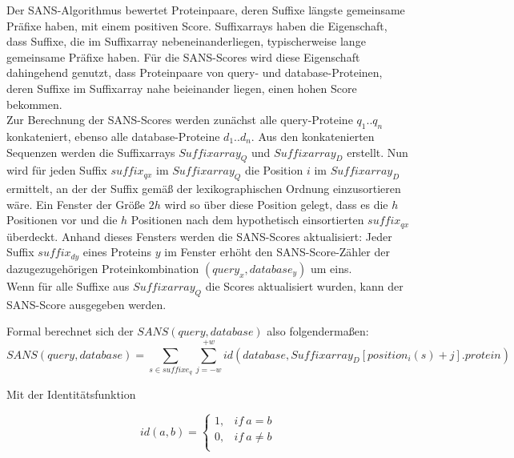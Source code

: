 \documentclass{article}
\begin{document}
Der SANS-Algorithmus bewertet Proteinpaare, deren Suffixe längste gemeinsame Präfixe haben, mit einem positiven Score. Suffixarrays haben die Eigenschaft, dass Suffixe, die im Suffixarray nebeneinanderliegen, typischerweise lange gemeinsame Präfixe haben. Für die SANS-Scores wird diese Eigenschaft dahingehend genutzt, dass Proteinpaare von query- und database-Proteinen, deren Suffixe im Suffixarray nahe beieinander liegen, einen hohen Score bekommen.\\
Zur Berechnung der SANS-Scores werden zunächst alle query-Proteine $q_1..q_n$ konkateniert, ebenso alle database-Proteine $d_1..d_n$. Aus den konkatenierten Sequenzen werden die Suffixarrays $Suffixarray_Q$ und $Suffixarray_D$ erstellt. Nun wird für jeden Suffix $suffix_{qx}$ im $Suffixarray_Q$ die Position $i$ im $Suffixarray_D$ ermittelt, an der der Suffix gemäß der lexikographischen Ordnung einzusortieren wäre. Ein Fenster der Größe $2h$ wird so über diese Position gelegt, dass es die $h$ Positionen vor und die $h$ Positionen nach dem hypothetisch einsortierten $suffix_{qx}$ überdeckt. Anhand dieses Fensters werden die SANS-Scores aktualisiert: Jeder Suffix $suffix_{dy}$ eines Proteins $y$ im Fenster erhöht den SANS-Score-Zähler der dazugezugehörigen Proteinkombination $(query_x,database_y)$ um eins. \\
Wenn für alle Suffixe aus $Suffixarray_Q$ die Scores aktualisiert wurden, kann der SANS-Score ausgegeben werden.

Formal berechnet sich der $SANS(query,database)$ also folgendermaßen:\\

\begin{equation}
SANS(query,database) = \sum_{s \in suffixe_q} \sum_{j=-w}^{+w} id(database,Suffixarray_D[position_i(s)  +j].protein) 
\end{equation}

Mit der Identitätsfunktion

\begin{equation}
id(a,b)=\begin{cases}
  1,  & if~a=b\\
  0,  & if~a\ne b\\
\end{cases}
\end{equation}
\end{document}
